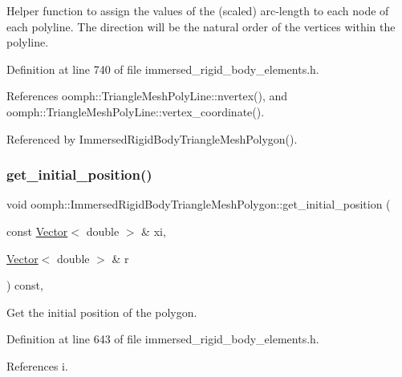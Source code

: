 Helper function to assign the values of the (scaled) arc-\/length to each node of each polyline. The direction will be the natural order of the vertices within the polyline. 

Definition at line 740 of file immersed\+\_\+rigid\+\_\+body\+\_\+elements.\+h.



References oomph\+::\+Triangle\+Mesh\+Poly\+Line\+::nvertex(), and oomph\+::\+Triangle\+Mesh\+Poly\+Line\+::vertex\+\_\+coordinate().



Referenced by Immersed\+Rigid\+Body\+Triangle\+Mesh\+Polygon().

\mbox{\label{classoomph_1_1ImmersedRigidBodyTriangleMeshPolygon_aba89865d17e2c1b5fa118e848d09028e}} 
\subsubsection{\texorpdfstring{get\+\_\+initial\+\_\+position()}{get\_initial\_position()}}
{\footnotesize\ttfamily void oomph\+::\+Immersed\+Rigid\+Body\+Triangle\+Mesh\+Polygon\+::get\+\_\+initial\+\_\+position (\begin{DoxyParamCaption}\item[{const \hyperlink{classoomph_1_1Vector}{Vector}$<$ double $>$ \&}]{xi,  }\item[{\hyperlink{classoomph_1_1Vector}{Vector}$<$ double $>$ \&}]{r }\end{DoxyParamCaption}) const\hspace{0.3cm}{\ttfamily [inline]}, {\ttfamily [private]}}



Get the initial position of the polygon. 



Definition at line 643 of file immersed\+\_\+rigid\+\_\+body\+\_\+elements.\+h.



References i.

\mbox{\label{classoomph_1_1ImmersedRigidBodyTriangleMeshPolygon_a29e3518f6fcdaeead14ae41f11e6fb5d}} 
